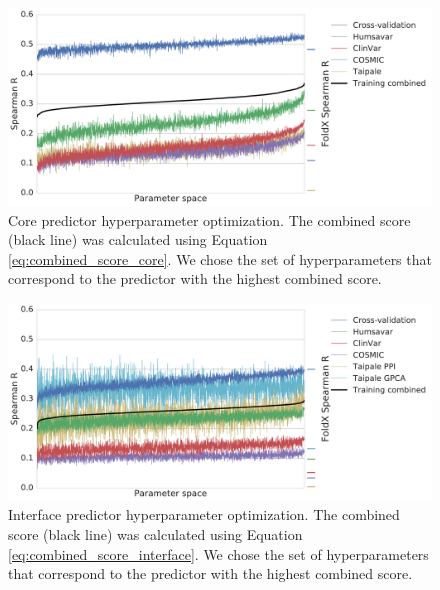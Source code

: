 
\begin{figure}[tb]
	\includegraphics[width=0.9\linewidth]{static/elaspic_training_set/machine_learning/gridsearch_core.pdf}
	\caption[Core predictor hyperparameter optimization.]{
        Core predictor hyperparameter optimization.
        The combined score (black line) was calculated using Equation \ref{eq:combined_score_core}.
		We chose the set of hyperparameters that correspond to the predictor with the highest combined score.
    }
	\label{fig:gridsearch_core}
\end{figure}

\begin{figure}[tb]
	\includegraphics[width=0.9\linewidth]{static/elaspic_training_set/machine_learning/gridsearch_interface.pdf}
    \caption[Interface predictor hyperparameter optimization.]{
        Interface predictor hyperparameter optimization.
        The combined score (black line) was calculated using Equation \ref{eq:combined_score_interface}.
		We chose the set of hyperparameters that correspond to the predictor with the highest combined score.
    }
	\label{fig:gridsearch_interface}
\end{figure}

\clearpage

